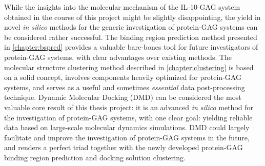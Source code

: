 While the insights into the molecular mechanism of the IL-10-GAG system obtained
in the course of this project might be slightly disappointing, the yield in
novel \textit{in silico} methods for the generic investigation of protein-GAG
systems can be considered rather successful. The binding region prediction
method presented in \cref{chapter:bspred} provides a valuable bare-bones tool
for future investigators of protein-GAG systems, with clear advantages over
existing methods. The molecular structure clustering method described in
\cref{chapter:clustering} is based on a solid concept, involves components
heavily optimized for protein-GAG systems, and serves as a useful and sometimes
\textit{essential} data post-processing technique. Dynamic Molecular Docking
(DMD) can be considered the most valuable core result of this thesis project: it
is an advanced \textit{in silico} method for the investigation of protein-GAG
systems, with one clear goal: yielding reliable data based on large-scale
molecular dynamics simulations. DMD could largely facilitate and improve the
investigation of protein-GAG systems in the future, and renders a perfect triad
together with the newly developed protein-GAG binding region prediction and
docking solution clustering.
